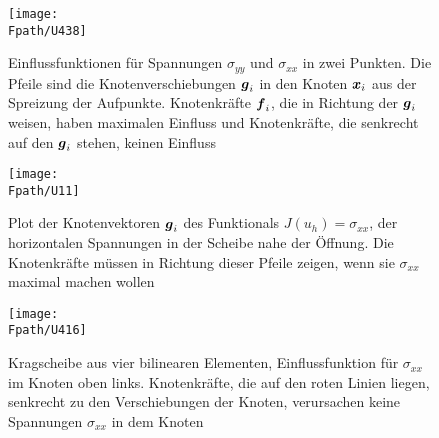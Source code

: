 {{%
\begin{figure}
\centering
{\texttt{[image: \\Fpath/U438]}}
  \caption{Einflussfunktionen f\"{u}r Spannungen $\sigma_{yy}$ und $\sigma_{xx}$ in zwei Punkten. Die Pfeile sind die Knotenverschiebungen $\mbox{\boldmath $g$}_i$ in den Knoten $\mbox{\boldmath $x$}_i$ aus der Spreizung der Aufpunkte. Knotenkr\"{a}fte $\mbox{\boldmath $f$}_i$, die in Richtung der $\mbox{\boldmath $g$}_i$ weisen, haben maximalen Einfluss und Knotenkr\"{a}fte, die senkrecht auf den $\mbox{\boldmath $g$}_i$ stehen, keinen Einfluss}  \label{U438}\label{Korrektur21}
\end{figure}
\begin{figure}
\centering
{\texttt{[image: \\Fpath/U11]}}
  \caption{ Plot der Knotenvektoren $\mbox{\boldmath $g$}_i$ des Funktionals $J(u_h) = \sigma_{xx}$, der horizontalen Spannungen in der Scheibe nahe der \"{O}ffnung. Die Knotenkr\"{a}fte m\"{u}ssen in Richtung dieser Pfeile zeigen, wenn sie $\sigma_{xx}$ maximal machen wollen}
  \label{U11}
\end{figure}%
\begin{figure}
\centering
{\texttt{[image: \\Fpath/U416]}}  %
  \caption{Kragscheibe aus vier bilinearen Elementen, Einflussfunktion f\"{u}r $\sigma_{xx}$ im Knoten oben links. Knotenkr\"{a}fte, die auf den roten Linien liegen, senkrecht zu den Verschiebungen der Knoten, verursachen keine Spannungen $\sigma_{xx}$ in dem Knoten}
  \label{U416}
\end{figure}%
\vspace{-0.7cm}

}}
